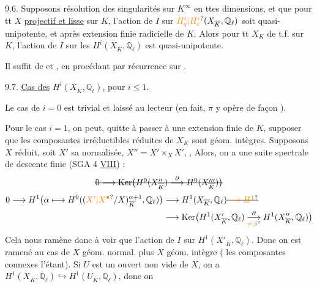   9.6. Supposons résolution des singularités sur $K^{\infty}$ en ttes dimensions, et que pour tt $X$  \uline{projectif et lisse} sur $K$,  l'action de $I$ sur $\unsure{H^i_q|H^i_c}(X_{\overline K},\mathbb{Q}_\ell)$ soit quasi-unipotente, et  après extension finie radicielle de $K$. Alors  pour tt $X_K$ de t.f. sur $K$, l'action de $I$ sur les $H^i(X_{\overline K},\mathbb{Q}_\ell)$ est quasi-unipotente.

Il suffit de    et , en procédant par récurrence sur .


9.7. \uline{Cas des} $H^i(X_{\overline K},\mathbb{Q}_\ell)$, pour $i\leq 1$.

Le cas de $i=0$ est trivial et laissé au lecteur (en fait, $\pi$ y opère de façon ).

Pour le cas $i=1$, on  peut, quitte à passer à une extension finie de $K$, supposer que les composantes irréductibles réduites de $X_K$ sont géom. intègres. Supposons $X$ réduit, soit $X'$ sa normalisée, $X''=X'\times_X X'$, ,  Alors, on  a une suite spectrale de descente finie (SGA 4 \uline{VIII}) :
\[
\deleted{0\longrightarrow\operatorname{Ker}\bigl(H^0(X''_{\overline K})\overset{\partial}{\longrightarrow}H^0(X'''_{\overline K})\bigr)}
\]
\[
\begin{aligned}
0\longrightarrow H^1\bigl(\alpha\longmapsto H^0((\unsure{X'|X^\bullet}/X)^{\alpha+1}_{\overline K},\mathbb{Q}_\ell)\bigr)&\longrightarrow H^1(X_{\overline K},\mathbb{Q}_\ell)\deleted{\unsure{\longrightarrow H^1}}\\
&\longrightarrow\operatorname{Ker}\bigl(H^1(X'_{\overline K},\mathbb{Q}_\ell)\overset{\partial}{\underset{\unsure{\neq|\delta}}{\longrightarrow}}H^1(X''_{\overline K},\mathbb{Q}_\ell)\bigr)
\end{aligned}
\]
Cela nous ramène donc à voir que l'action de $I$ sur  $H^1(X'_{\overline K},\mathbb{Q}_\ell)$. Donc on est ramené au
cas de $X$ géom. normal.   plus $X$ géom. intègre ( les composantes connexes l'étant). Si $U$ est un ouvert non vide de $X$, on a $H^1(X_{\overline K},\mathbb{Q}_\ell)\hookrightarrow H^1(U_{\overline K},\mathbb{Q}_\ell)$, donc on 


